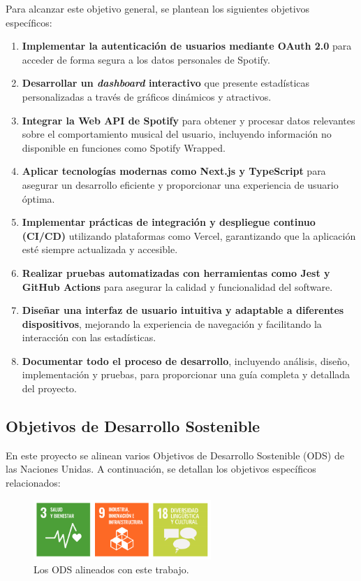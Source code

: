 Para alcanzar este objetivo general, se plantean los siguientes objetivos específicos:

\begin{enumerate}
    \item \textbf{Implementar la autenticación de usuarios mediante OAuth 2.0} para acceder de forma segura a los datos personales de Spotify.
    \item \textbf{Desarrollar un \textit{dashboard} interactivo} que presente estadísticas personalizadas a través de gráficos dinámicos y atractivos.
    \item \textbf{Integrar la Web API de Spotify} para obtener y procesar datos relevantes sobre el comportamiento musical del usuario, incluyendo información no disponible en funciones como Spotify Wrapped.
    \item \textbf{Aplicar tecnologías modernas como Next.js y TypeScript} para asegurar un desarrollo eficiente y proporcionar una experiencia de usuario óptima.
    \item \textbf{Implementar prácticas de integración y despliegue continuo (CI/CD)} utilizando plataformas como Vercel, garantizando que la aplicación esté siempre actualizada y accesible.
    \item \textbf{Realizar pruebas automatizadas con herramientas como Jest y GitHub Actions} para asegurar la calidad y funcionalidad del software.
    \item \textbf{Diseñar una interfaz de usuario intuitiva y adaptable a diferentes dispositivos}, mejorando la experiencia de navegación y facilitando la interacción con las estadísticas.
    \item \textbf{Documentar todo el proceso de desarrollo}, incluyendo análisis, diseño, implementación y pruebas, para proporcionar una guía completa y detallada del proyecto.
\end{enumerate}

\subsection{Objetivos de Desarrollo Sostenible}

En este proyecto se alinean varios Objetivos de Desarrollo Sostenible (ODS) de las Naciones Unidas. A continuación, se detallan los objetivos específicos relacionados:

\begin{figure}[h]
    \centering
    \includegraphics[width=0.6\textwidth]{figures/tres_ods_relacionadas.png}
    \caption{Los ODS alineados con este trabajo.}
    \label{fig:tres_ods}
\end{figure}


